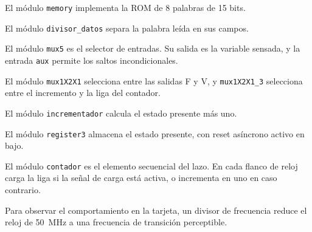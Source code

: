 El módulo \texttt{memory} implementa la ROM de 8 palabras de 15 bits.


\label{fig:memory}

El módulo \texttt{divisor\_datos} separa la palabra leída en sus campos.


\label{fig:divisor}

El módulo \texttt{mux5} es el selector de entradas. Su salida es la variable sensada, y la entrada
\texttt{aux} permite los saltos incondicionales.


\label{fig:mux5}

El módulo \texttt{mux1X2X1} selecciona entre las salidas F y V, y \texttt{mux1X2X1\_3} selecciona
entre el incremento y la liga del contador.


\label{fig:mux1}


\label{fig:mux13}

El módulo \texttt{incrementador} calcula el estado presente más uno.


\label{fig:incr}

El módulo \texttt{register3} almacena el estado presente, con reset asíncrono activo en bajo.


\label{fig:register}

El módulo \texttt{contador} es el elemento secuencial del lazo. En cada flanco de reloj carga la liga
si la señal de carga está activa, o incrementa en uno en caso contrario.


\label{fig:contador}

Para observar el comportamiento en la tarjeta, un divisor de frecuencia reduce el reloj de 50~MHz a
una frecuencia de transición perceptible.

